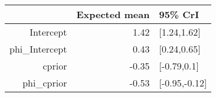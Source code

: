 \begin{tabular}{rrl}
  \hline
 & Expected mean & 95\% CrI \\ 
  \hline
Intercept & 1.42 & [1.24,1.62] \\ 
  phi\_Intercept & 0.43 & [0.24,0.65] \\ 
  cprior & -0.35 & [-0.79,0.1] \\ 
  phi\_cprior & -0.53 & [-0.95,-0.12] \\ 
   \hline
\end{tabular}

